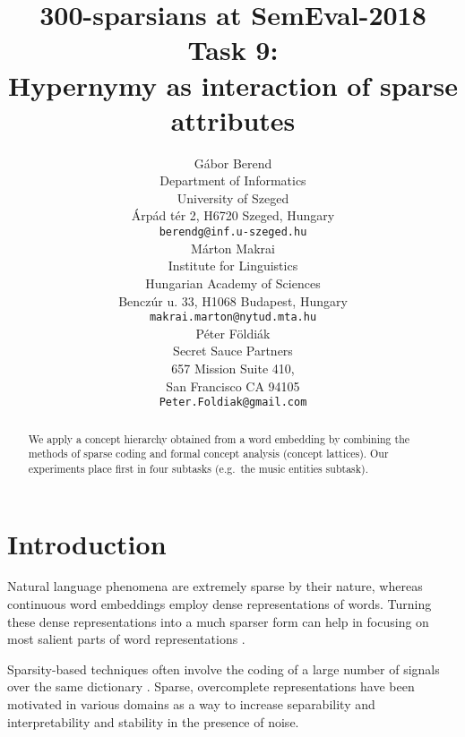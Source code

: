 \documentclass[11pt,a4paper]{article}
\title{300-sparsians at SemEval-2018 Task 9: \\
Hypernymy as interaction of sparse attributes}
\author{Gábor Berend \\
Department of Informatics \\ University of Szeged \\
Árpád tér 2, H6720 Szeged, Hungary \\
{\tt berendg@inf.u-szeged.hu} \\\And
  Márton Makrai  \\
  Institute for Linguistics \\
  Hungarian Academy of Sciences \\
  Benczúr u. 33, H1068 Budapest, Hungary \\
  {\tt makrai.marton@nytud.mta.hu} \\\AND
  Péter Földiák \\
  Secret Sauce Partners \\
  657 Mission Suite 410, \\
  San Francisco CA 94105 \\
  {\tt Peter.Foldiak@gmail.com} \\}
\date{}
\begin{document}
\maketitle

\begin{abstract}
  We apply a concept hierarchy obtained from a word embedding by combining the
  methods of sparse coding and formal concept analysis (concept lattices).
  Our experiments place first in four subtasks (e.g.~the music entities
  subtask).
\end{abstract}


\section{Introduction}

Natural language phenomena are extremely sparse by their nature,
whereas continuous word embeddings employ dense representations of words.
Turning these dense representations into a much sparser form can help in
focusing on most salient parts of word representations
\citep{Faruqui:2015,Berend:2017,Subramanian:2018}.


Sparsity-based techniques often involve the coding of a large number of signals
over the same dictionary \citep{Rubinstein:2008}. Sparse, overcomplete
representations have been motivated in various domains as a way to increase
separability and interpretability \citep{Olshausen:1997} and
stability in the presence of noise.
\end{document}

